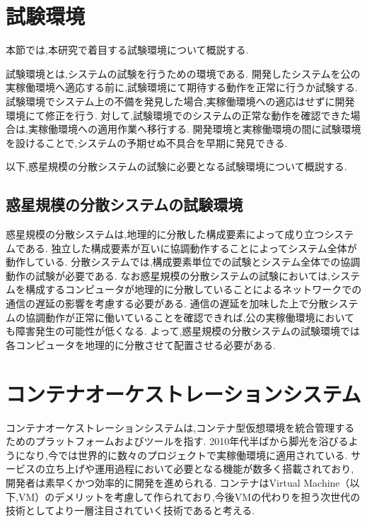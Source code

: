 \section{試験環境}
\label{bg:staging}

本節では,本研究で着目する試験環境について概説する.

試験環境とは,システムの試験を行うための環境である.
開発したシステムを公の実稼働環境へ適応する前に,試験環境にて期待する動作を正常に行うか試験する.
試験環境でシステム上の不備を発見した場合,実稼働環境への適応はせずに開発環境にて修正を行う.
対して,試験環境でのシステムの正常な動作を確認できた場合は,実稼働環境への適用作業へ移行する.
開発環境と実稼働環境の間に試験環境を設けることで,システムの予期せぬ不具合を早期に発見できる.

以下,惑星規模の分散システムの試験に必要となる試験環境について概説する.

\subsection{惑星規模の分散システムの試験環境}
\label{bg:staging:planetary-scale-distributed-system}

惑星規模の分散システムは,地理的に分散した構成要素によって成り立つシステムである.
独立した構成要素が互いに協調動作することによってシステム全体が動作している.
分散システムでは,構成要素単位での試験とシステム全体での協調動作の試験が必要である.
なお惑星規模の分散システムの試験においては,システムを構成するコンピュータが地理的に分散していることによるネットワークでの通信の遅延の影響を考慮する必要がある.
通信の遅延を加味した上で分散システムの協調動作が正常に働いていることを確認できれば,公の実稼働環境においても障害発生の可能性が低くなる.
よって,惑星規模の分散システムの試験環境では各コンピュータを地理的に分散させて配置させる必要がある.

\section{コンテナオーケストレーションシステム}
\label{background:container-orchestration-system}

コンテナオーケストレーションシステムは,コンテナ型仮想環境を統合管理するためのプラットフォームおよびツールを指す.
2010年代半ばから脚光を浴びるようになり,今では世界的に数々のプロジェクトで実稼働環境に適用されている.
サービスの立ち上げや運用過程において必要となる機能が数多く搭載されており,開発者は素早くかつ効率的に開発を進められる.
コンテナはVirtual Machine（以下,VM）のデメリットを考慮して作られており,今後VMの代わりを担う次世代の技術としてより一層注目されていく技術であると考える.

